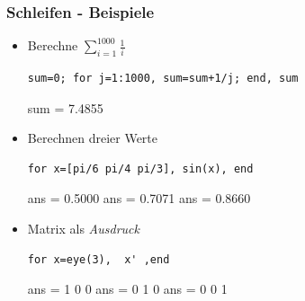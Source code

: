 \documentclass[hyperref={xetex}]{beamer}
\begin{document}
%
%
\begin{frame}[fragile]\frametitle{Schleifen - Beispiele}
\begin{itemize}
\item Berechne $\sum_{i=1}^{1000} \frac{1}{i}$
\begin{lstlisting}
sum=0; for j=1:1000, sum=sum+1/j; end, sum
\end{lstlisting}
\begin{matlab}
sum =  7.4855 
\end{matlab}
\item Berechnen dreier Werte
\begin{lstlisting}
for x=[pi/6 pi/4 pi/3], sin(x), end
\end{lstlisting}
\begin{matlab}
ans =    0.5000
ans =    0.7071
ans =    0.8660 
\end{matlab}
\item Matrix als {\it Ausdruck}
\begin{lstlisting}
for x=eye(3),  x' ,end
\end{lstlisting}
\begin{matlab}
ans =     1     0     0
ans =     0     1     0
ans =     0     0     1 
\end{matlab}
\end{itemize}
\end{frame}
\end{document}

